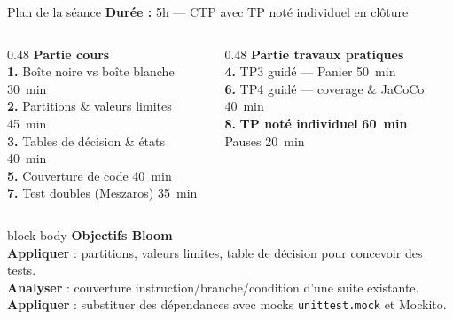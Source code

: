 \documentclass[aspectratio=169,11pt]{beamer}
\newcommand{\duree}[1]{{\small\color{accent2}\textbf{Durée :} #1}}
\begin{document}
\begin{frame}[t]{Plan de la séance}
\duree{5h --- CTP avec TP noté individuel en clôture}
\vspace{0.4cm}
\begin{columns}[T,onlytextwidth]
\begin{column}{0.48\textwidth}
\textbf{\color{accent}Partie cours}\\[0.2em]
\footnotesize
\textbf{1.} Boîte noire vs boîte blanche \hfill {\color{textsoft}30~min}\\
\textbf{2.} Partitions \& valeurs limites \hfill {\color{textsoft}45~min}\\
\textbf{3.} Tables de décision \& états \hfill {\color{textsoft}40~min}\\
\textbf{5.} Couverture de code \hfill {\color{textsoft}40~min}\\
\textbf{7.} Test doubles (Meszaros) \hfill {\color{textsoft}35~min}\\
\end{column}
\begin{column}{0.48\textwidth}
\textbf{\color{accent2}Partie travaux pratiques}\\[0.2em]
\footnotesize
\textbf{4.} TP3 guidé --- Panier \hfill {\color{textsoft}50~min}\\
\textbf{6.} TP4 guidé --- coverage \& JaCoCo \hfill {\color{textsoft}40~min}\\
\textbf{\color{bad}8.} \textbf{TP noté individuel} \hfill \textbf{\color{bad}60~min}\\[0.2em]
{\color{textsoft}Pauses \hfill 20~min}
\end{column}
\end{columns}
\vspace{0.4cm}
\begin{beamercolorbox}[wd=\linewidth,sep=0.5em,rounded=true]{block body}
{\color{accent}\bfseries\small Objectifs Bloom}\\[0.1em]
\footnotesize
\textbf{Appliquer} : partitions, valeurs limites, table de décision pour concevoir des tests.\\
\textbf{Analyser} : couverture instruction/branche/condition d'une suite existante.\\
\textbf{Appliquer} : substituer des dépendances avec mocks \texttt{unittest.mock} et Mockito.
\end{beamercolorbox}
\end{frame}

\end{document}
